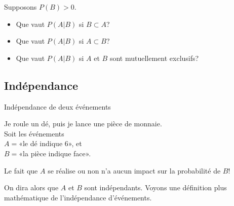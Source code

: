 \documentclass{BeamerTemplate}
\begin{document}
\begin{frame}[plain, t]%



\QuizBanner
\bigskip

Supposons $P(B)>0$.
\vspace{3mm}

\begin{itemize}\itemsep1.5cm
\item Que vaut $P(A|B)$ si $B\subset A$?

\item Que vaut $P(A|B)$ si $A\subset B$?

\item Que vaut $P(A|B)$ si $A$ et $B$ sont mutuellement exclusifs?
\vspace{1cm}
\end{itemize}

\end{frame}

\subsection{Indépendance}

\begin{frame}[t]{Indépendance de deux événements}

 \bigskip
 Je roule un dé, puis je lance une pièce  de monnaie. \\Soit les événements\\
  $A=$«le dé indique 6», et \\
  $B=$«la pièce indique  face». \\

  \bigskip

Le fait que $A$ se réalise ou non n'a aucun impact sur la probabilité de $B$!
\bigskip

On dira alors que $A$ et $B$ sont \alert{indépendants}. Voyons une définition plus mathématique de l'indépendance d'événements.
\end{frame}
\end{document}
